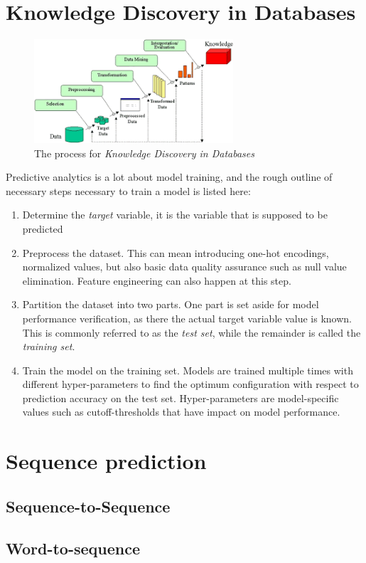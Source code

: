 \section{Knowledge Discovery in Databases}
\begin{figure}
	\centering
	\includegraphics[width=20em]{gfx/kdd_process}
	\caption{The process for \textit{Knowledge Discovery in Databases}}
	\label{fig:kdd_process}
\end{figure}
Predictive analytics is a lot about model training, and the rough outline of necessary steps necessary to train a model is listed here:
\begin{enumerate}
	\item Determine the \textit{target} variable, it is the variable that is supposed to be predicted
	\item Preprocess the dataset. This can mean introducing one-hot encodings, normalized values, but also basic data quality assurance such as null value elimination. Feature engineering can also happen at this step.
	\item Partition the dataset into two parts. One part is set aside for model performance verification, as there the actual target variable value is known. This is commonly referred to as the \textit{test set}, while the remainder is called the \textit{training set}.
	\item Train the model on the training set. Models are trained multiple times with different hyper-parameters to find the optimum configuration with respect to prediction accuracy on the test set. Hyper-parameters are model-specific values such as cutoff-thresholds that have impact on model performance.
\end{enumerate}

\section{Sequence prediction}
\subsection{Sequence-to-Sequence}
\subsection{Word-to-sequence}

